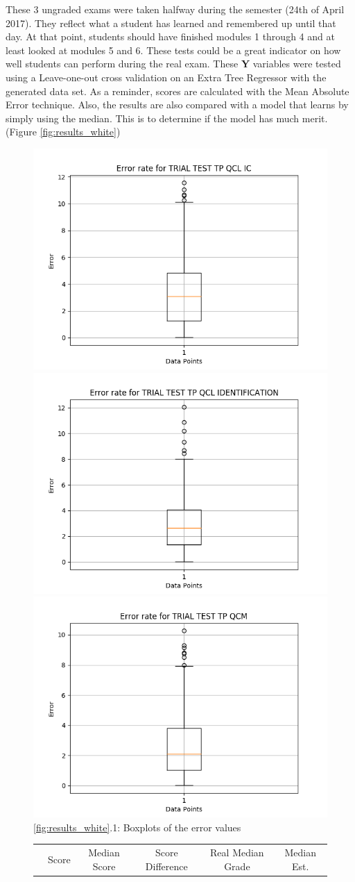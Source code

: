 \documentclass[a4paper,11pt]{report}
\numberwithin{figure}{chapter} %
\begin{document}
    These 3 ungraded exams were taken halfway during the semester (24th of April 2017).
    They reflect what a student has learned and remembered up until that day.
    At that point, students should have finished modules 1 through 4 and at least looked at modules 5 and 6.
    These tests could be a great indicator on how well students can perform during the real exam.
    These \textbf{Y} variables were tested using a Leave-one-out cross validation on an Extra Tree Regressor with the generated data set.
    As a reminder, scores are calculated with the Mean Absolute Error technique.
    Also, the results are also compared with a model that learns by simply using the median.
    This is to determine if the model has much merit. (Figure \ref{fig:results_white})
    \begin{figure}[H]
      \centering
  	  \includegraphics[width=.3\linewidth]{plots/cv_boxplot_TRIAL_TEST_TP_QCL_IC_2018-04-27_14_35_12.png}
  	  \includegraphics[width=.3\linewidth]{plots/cv_boxplot_TRIAL_TEST_TP_QCL_IDENTIFICATION_2018-04-27_14_31_56.png}
      \includegraphics[width=.3\linewidth]{plots/cv_boxplot_TRIAL_TEST_TP_QCM_2018-04-27_17_16_59.png}
      \\
      \ref{fig:results_white}.1: Boxplots of the error values
      \\
      \vspace{0.5cm}
      \begin{tabular}{| l | c | c | c | c | c |}
      \hline
      & \tiny{Score} & \tiny{Median Score} & \tiny{Score Difference} & \tiny{Real Median Grade} & \tiny{Median Est.
}
\end{tabular}
\end{figure}
\end{document}

